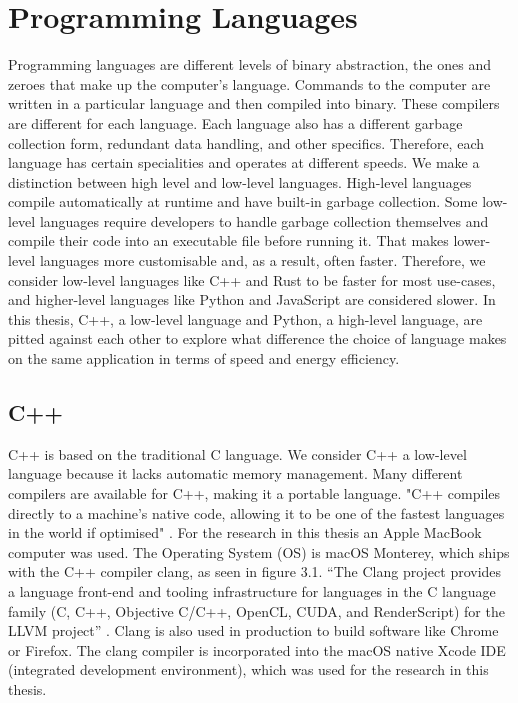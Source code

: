 \chapter{Programming Languages}

Programming languages are different levels of binary abstraction, the ones and zeroes that make up the computer's language. Commands to the computer are written in a particular language and then compiled into binary.
These compilers are different for each language. Each language also has a different garbage collection form, redundant data handling, and other specifics. Therefore, each language has certain specialities and operates at different speeds.
We make a distinction between high level and low-level languages. High-level languages compile automatically at runtime and have built-in garbage collection. Some low-level languages require developers to handle garbage collection themselves and compile their code into an executable file before running it.
That makes lower-level languages more customisable and, as a result, often faster.
Therefore, we consider low-level languages like C++ and Rust to be faster for most use-cases, and higher-level languages like Python and JavaScript are considered slower.
In this thesis, C++, a low-level language and Python, a high-level language, are pitted against each other to explore what difference the choice of language makes on the same application in terms of speed and energy efficiency.

\section{C++}
C++ is based on the traditional C language. We consider C++ a low-level language because it lacks automatic memory management. Many different compilers are available for C++, making it a portable language. "C++ compiles directly to a machine's native code, allowing it to be one of the fastest languages in the world if optimised" \cite{C++}.
For the research in this thesis an Apple MacBook computer was used. The Operating System (OS) is macOS Monterey, which ships with the C++ compiler clang, as seen in figure 3.1. “The Clang project provides a language front-end and tooling infrastructure for languages in the C language family (C, C++, Objective C/C++, OpenCL, CUDA, and RenderScript) for the LLVM project” \cite{clang}. Clang is also used in production to build software like Chrome or Firefox. The clang compiler is incorporated into the macOS native Xcode IDE (integrated development environment), which was used for the research in this thesis.

